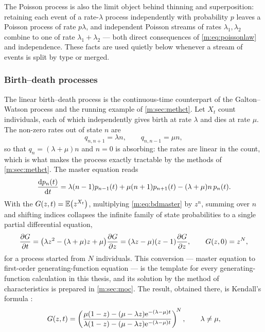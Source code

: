 The Poisson process is also the limit object behind thinning and superposition:
retaining each event of a rate-$\lambda$ process independently with probability
$p$ leaves a Poisson process of rate $p\lambda$, and independent Poisson streams
of rates $\lambda_1,\lambda_2$ combine to one of rate $\lambda_1+\lambda_2$ ---
both direct consequences of \cref{m:eq:poissonlaw} and independence. These facts
are used quietly below whenever a stream of events is split by type or merged.

\subsubsection{Birth--death processes}
\label{m:sec:linbd}

The linear birth--death process is the continuous-time counterpart of the
Galton--Watson process and the running example of \cref{m:sec:methct}. Let
$X_t$ count individuals, each of which independently gives birth at rate
$\lambda$ and dies at rate $\mu$. The non-zero rates out of state $n$ are
\begin{equation}
\label{m:eq:bdrates}
q_{n,n+1} = \lambda n,
\qquad
q_{n,n-1} = \mu n ,
\end{equation}
so that $q_n=(\lambda+\mu)n$ and $n=0$ is absorbing: the rates are linear in the
count, which is what makes the process exactly tractable by the methods of
\cref{m:sec:methct}. The master equation reads
\begin{equation}
\label{m:eq:bdmaster}
\frac{\mathrm{d} p_n(t)}{\mathrm{d} t} = \lambda(n-1)p_{n-1}(t) + \mu(n+1)p_{n+1}(t) - (\lambda+\mu)n\,p_n(t).
\end{equation}
With the \pgf{} $G(z,t)=\mathbb{E}\!\left(z^{X_t}\right)$, multiplying \cref{m:eq:bdmaster} by
$z^n$, summing over $n$ and shifting indices collapses the infinite family of
state probabilities to a single partial differential equation,
\begin{equation}
\label{m:eq:bdpde}
\frac{\partial G}{\partial t} = \bigl(\lambda z^2 - (\lambda+\mu)z + \mu\bigr)\frac{\partial G}{\partial z}
= (\lambda z-\mu)(z-1)\frac{\partial G}{\partial z},
\qquad G(z,0) = z^{N},
\end{equation}
for a process started from $N$ individuals. This conversion --- master equation
to first-order generating-function equation --- is the template for every
generating-function calculation in this thesis, and its solution by the method of
characteristics is prepared in \cref{m:sec:moc}. The result, obtained there, is
Kendall's formula \cite{Kendall1948}:
\begin{equation}
\label{m:eq:bdsolution}
G(z,t) = \left(\frac{\mu(1-z) - (\mu-\lambda z)\mathrm{e}^{-(\lambda-\mu)t}}
{\lambda(1-z) - (\mu-\lambda z)\mathrm{e}^{-(\lambda-\mu)t}}\right)^{\!N},
\qquad \lambda\neq\mu ,
\end{equation}
